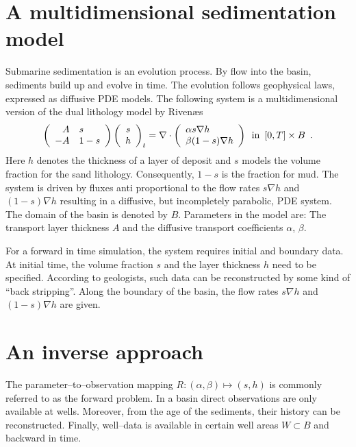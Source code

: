 \section{A multidimensional sedimentation model}

Submarine sedimentation is an evolution process.
By flow into the basin, sediments build up and evolve in time.
The evolution follows geophysical laws, expressed as diffusive PDE models.
The following system is a multidimensional version of the dual lithology model by Riven{\ae}s \cite{Riv92, Riv93}
\begin{equation} \label{model}
\left(\begin{array}{rl} A & s \\ -A & 1-s \end{array}\right)
\left(\begin{array}{c} s \\ h \end{array}\right)_t = 
\nabla \cdot \left( \begin{array}{l} \alpha s \nabla h \\ \beta (1-s) \nabla h \end{array} \right) 
\enspace \hbox{in} \enspace [0,T] \times B \enspace .
\end{equation}
Here $h$ denotes the thickness of a layer of deposit and 
$s$ models the volume fraction for the sand lithology.
Consequently, $1-s$ is the fraction for mud.
The system is driven by fluxes anti proportional to the flow rates 
$s \nabla h$ and $(1-s) \nabla h$
resulting in a diffusive, but incompletely parabolic, PDE system.
The domain of the basin is denoted by $B$.
Parameters in the model are: 
The transport layer thickness $A$ and the diffusive transport coefficients $\alpha$, $\beta$.

For a forward in time simulation, the system requires initial and boundary data.
At initial time, the volume fraction $s$ and the layer thickness $h$ need to be specified.
According to geologists, such data can be reconstructed by some kind of ``back stripping''.
Along the boundary of the basin, the flow rates $s \nabla h$ and $(1-s) \nabla h$ are given.

\section{An inverse approach}

The parameter--to--observation mapping 
$R: (\alpha, \beta) \mapsto (s, h)$
is commonly referred to as the forward problem.
In a basin direct observations are only available at wells.
Moreover, from the age of the sediments, their history can be reconstructed.
Finally, well--data is available in certain well areas $W \subset B$ and backward in time.

